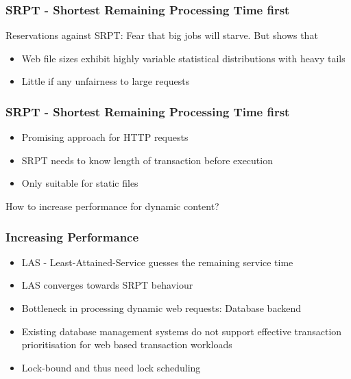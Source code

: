 \documentclass[9pt]{beamer}
\begin{document}
\begin{frame}
\frametitle<presentation>{SRPT - Shortest Remaining Processing Time first}
Reservations against SRPT: Fear that big jobs will starve. But \cite{schorederSchedule} shows that
  \begin{itemize}
    \item Web file sizes exhibit highly variable statistical distributions with heavy tails
    \item Little if any unfairness to large requests 
  \end{itemize}
\end{frame}

\begin{frame}
\frametitle<presentation>{SRPT - Shortest Remaining Processing Time first}
  \begin{itemize}
    \item Promising approach for HTTP requests
    \item SRPT needs to know length of transaction before execution
    \item Only suitable for static files 
  \end{itemize}
  
How to increase performance for dynamic content?

\end{frame}

\begin{frame}
\frametitle<presentation>{Increasing Performance}
  \begin{itemize}
    \item LAS - Least-Attained-Service guesses the remaining service time
    \item LAS converges towards SRPT behaviour
    \item Bottleneck in processing dynamic web requests: Database backend
    \item Existing database management systems do not support effective transaction prioritisation for web based transaction workloads
    \item Lock-bound and thus need lock scheduling
  \end{itemize}
\end{frame}
\end{document}
